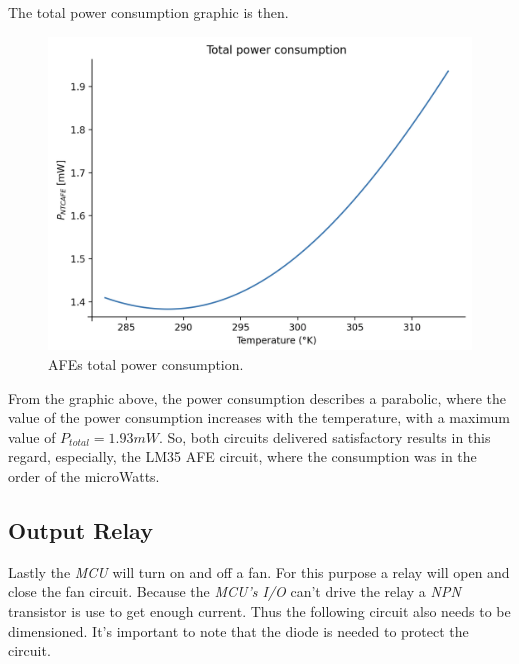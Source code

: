\documentclass[12pt]{article}
\begin{document}
    The total power consumption graphic is then.
    \begin{figure}[H] 
        \centering
        \includegraphics*[scale = 0.5]{images/PowerTotal.png}
        \caption{AFEs total power consumption.}
    \end{figure}

    From the graphic above, the power consumption describes a parabolic, where the value of the power consumption increases with the 
    temperature, with a maximum value of $P_{total} = 1.93 mW$. So, both circuits delivered satisfactory results in this regard, 
    especially, the LM35 AFE circuit, where the consumption was in the order of the microWatts.
\subsection{Output Relay }
    
    Lastly the \textit{MCU} will turn on and off a fan. For this purpose 
    a relay will open and close the fan circuit. Because the \textit{MCU's I/O} 
    can't drive the relay a \textit{NPN} transistor is use to get enough current.
    Thus the following circuit also needs to be dimensioned. It's important to note
    that the diode is needed to protect the circuit.
    
\end{document}
